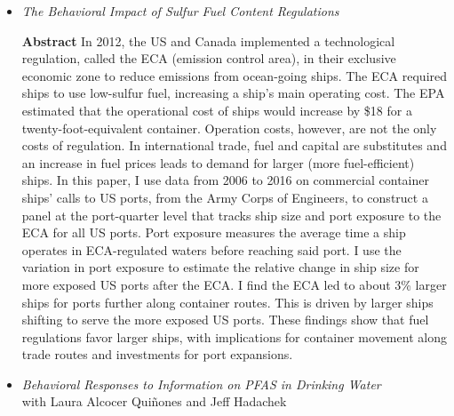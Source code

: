 \documentclass{article}[12]
\begin{document}
\begin{itemize}
    \item \textit{The Behavioral Impact of Sulfur Fuel Content Regulations}

\textbf{Abstract} In 2012, the US and Canada implemented a technological regulation, called the ECA (emission control area), in their exclusive economic zone to reduce emissions from ocean-going ships. The ECA required ships to use low-sulfur fuel, increasing a ship’s main operating cost. The EPA estimated that the operational cost of ships would increase by \$18 for a twenty-foot-equivalent container. Operation costs, however, are not the only costs of regulation. In international trade, fuel and capital are substitutes and an increase in fuel prices leads to demand for larger (more fuel-efficient) ships. In this paper, I use data from 2006 to 2016 on commercial container ships’ calls to US ports, from the Army Corps of Engineers, to construct a panel at the port-quarter level that tracks ship size and port exposure to the ECA for all US ports. Port exposure measures the average time a ship operates in ECA-regulated waters before reaching said port. I use the variation in port exposure to estimate the relative change in ship size for more exposed US ports after the ECA. I find the ECA led to about 3\% larger ships for ports further along container routes. This is driven by larger ships shifting to serve the more exposed US ports. These findings show that fuel regulations favor larger ships, with implications for container movement along trade routes and investments for port expansions.  
    \item \textit{Behavioral Responses to Information on PFAS in Drinking Water} \\ with Laura Alcocer Qui\~nones and Jeff Hadachek 
    \\    

\end{itemize}
\end{document}
